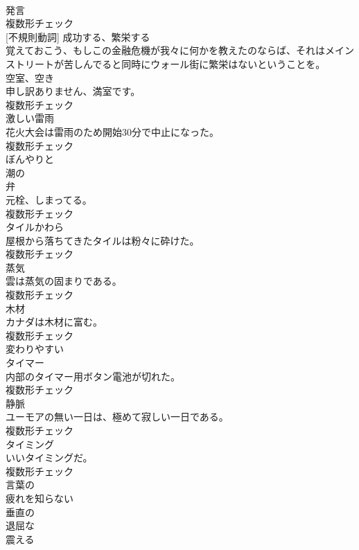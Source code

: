 \documentclass[8pt]{extreport}
\begin{document}
\begin{CJK}{UTF8}{min}
\\	[名詞]	発言	
\\	複数形チェック
\\	[動詞] [不規則動詞]	成功する、繁栄する	
\\	覚えておこう、もしこの金融危機が我々に何かを教えたのならば、それはメインストリートが苦しんでると同時にウォール街に繁栄はないということを。	
\\	[名詞]	空室、空き	
\\	申し訳ありません、満室です。	
\\	複数形チェック
\\	[名詞]	激しい雷雨	
\\	花火大会は雷雨のため開始30分で中止になった。	
\\	複数形チェック
\\	[副詞]	ぼんやりと	
\\	[形容詞]	潮の	
\\	[名詞]	弁	
\\	元栓、しまってる。	
\\	複数形チェック
\\	[名詞]	タイルかわら	
\\	屋根から落ちてきたタイルは粉々に砕けた。	
\\	複数形チェック
\\	[名詞]	蒸気	
\\	雲は蒸気の固まりである。	
\\	複数形チェック
\\	[名詞]	木材	
\\	カナダは木材に富む。	
\\	複数形チェック
\\	[形容詞]	変わりやすい	
\\	[名詞]	タイマー	
\\	内部のタイマー用ボタン電池が切れた。	
\\	複数形チェック
\\	[名詞]	静脈	
\\	ユーモアの無い一日は、極めて寂しい一日である。	
\\	複数形チェック
\\	[名詞]	タイミング	
\\	いいタイミングだ。	
\\	複数形チェック
\\	[形容詞]	言葉の	
\\	[形容詞]	疲れを知らない	
\\	[形容詞]	垂直の	
\\	[形容詞]	退屈な	
\\	[動詞]	震える	

\end{CJK}
\end{document}
